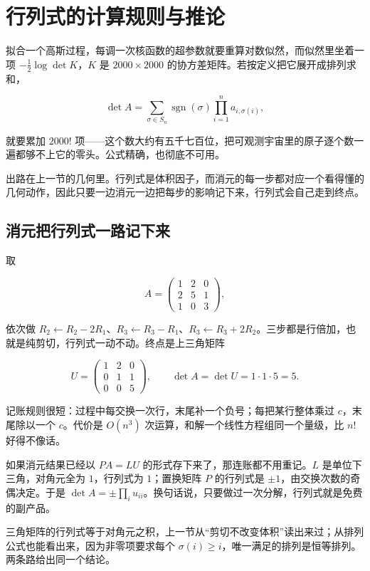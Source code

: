 \section{行列式的计算规则与推论}
\label{sec:03-Linear-Algebra/04-Determinants/02}

拟合一个高斯过程，每调一次核函数的超参数就要重算对数似然，而似然里坐着一项 \(-\tfrac12\log\det K\)，\(K\) 是 \(2000\times2000\) 的协方差矩阵。若按定义把它展开成排列求和，

\[
\det A=\sum_{\sigma\in S_n}\operatorname{sgn}(\sigma)\prod_{i=1}^n a_{i,\sigma(i)},
\]

就要累加 \(2000!\) 项——这个数大约有五千七百位，把可观测宇宙里的原子逐个数一遍都够不上它的零头。公式精确，也彻底不可用。

出路在上一节的几何里。行列式是体积因子，而消元的每一步都对应一个看得懂的几何动作，因此只要一边消元一边把每步的影响记下来，行列式会自己走到终点。

\subsection{消元把行列式一路记下来}

取

\[
A=\begin{pmatrix}1&2&0\\2&5&1\\1&0&3\end{pmatrix},
\]

依次做 \(R_2\leftarrow R_2-2R_1\)、\(R_3\leftarrow R_3-R_1\)、\(R_3\leftarrow R_3+2R_2\)。三步都是行倍加，也就是纯剪切，行列式一动不动。终点是上三角矩阵

\[
U=\begin{pmatrix}1&2&0\\0&1&1\\0&0&5\end{pmatrix},
\qquad
\det A=\det U=1\cdot1\cdot5=5.
\]

记账规则很短：过程中每交换一次行，末尾补一个负号；每把某行整体乘过 \(c\)，末尾除以一个 \(c\)。代价是 \(O(n^3)\) 次运算，和解一个线性方程组同一个量级，比 \(n!\) 好得不像话。

如果消元结果已经以 \(PA=LU\) 的形式存下来了，那连账都不用重记。\(L\) 是单位下三角，对角元全为 \(1\)，行列式为 \(1\)；置换矩阵 \(P\) 的行列式是 \(\pm1\)，由交换次数的奇偶决定。于是 \(\det A=\pm\prod_i u_{ii}\)。换句话说，只要做过一次分解，行列式就是免费的副产品。

三角矩阵的行列式等于对角元之积，上一节从``剪切不改变体积''读出来过；从排列公式也能看出来，因为非零项要求每个 \(\sigma(i)\ge i\)，唯一满足的排列是恒等排列。两条路给出同一个结论。

